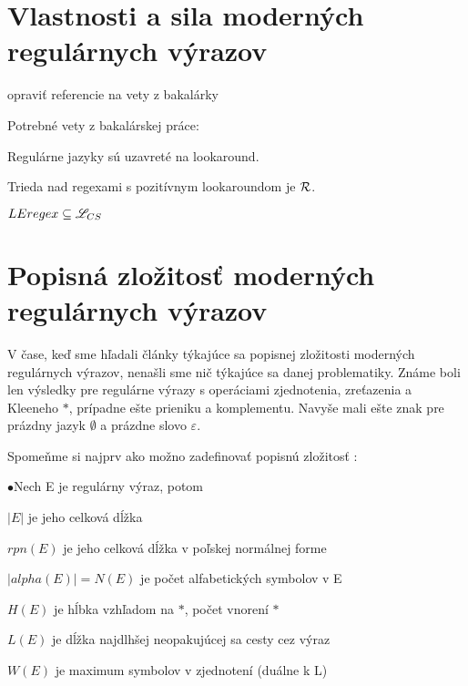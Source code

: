 \section[Vlastnosti a sila]{Vlastnosti a sila moderných regulárnych výrazov}
\label{usila}

\todo opraviť referencie na vety z bakalárky

Potrebné vety z bakalárskej práce:

\begin{veta}[Veta 2.2.5.]\label{lookahead+R}
Regulárne jazyky sú uzavreté na lookaround.
\end{veta}

\begin{veta}[Veta 2.2.10.]\label{lookaround+R}
Trieda nad regexami s pozitívnym lookaroundom je ${\cal R}$.
\end{veta} 

\begin{veta}[Veta 2.2.14.]\label{le+lcs}
$ LEregex \subseteq \mathscr{L}_{CS} $
\end{veta}

\section[Popisná zložitosť]{Popisná zložitosť moderných regulárnych výrazov}
\label{uzlozitost}

V čase, keď sme hľadali články týkajúce sa popisnej zložitosti moderných regulárnych výrazov, nenašli sme nič týkajúce sa danej problematiky. Známe boli len výsledky pre regulárne výrazy s operáciami zjednotenia, zreťazenia a Kleeneho $*$, prípadne ešte prieniku a komplementu. Navyše mali ešte znak pre prázdny jazyk $\emptyset$ a prázdne slovo $\varepsilon$.

Spomeňme si najprv ako možno zadefinovať popisnú zložitosť \cite{newResults} \cite{compMeasures75}:

\begin{list}{$\bullet$}{Nech E je regulárny výraz, potom}
\item $|E|$ je jeho celková dĺžka
\item $rpn(E)$ je jeho celková dĺžka v poľskej normálnej forme
\item $|alpha(E)|= N(E)$ je počet alfabetických symbolov v E
\item $H(E)$ je hĺbka vzhľadom na $*$, počet vnorení $*$
\item $L(E)$ je dĺžka najdlhšej neopakujúcej sa cesty cez výraz
\item $W(E)$ je maximum symbolov v zjednotení (duálne k L)
\end{list}


